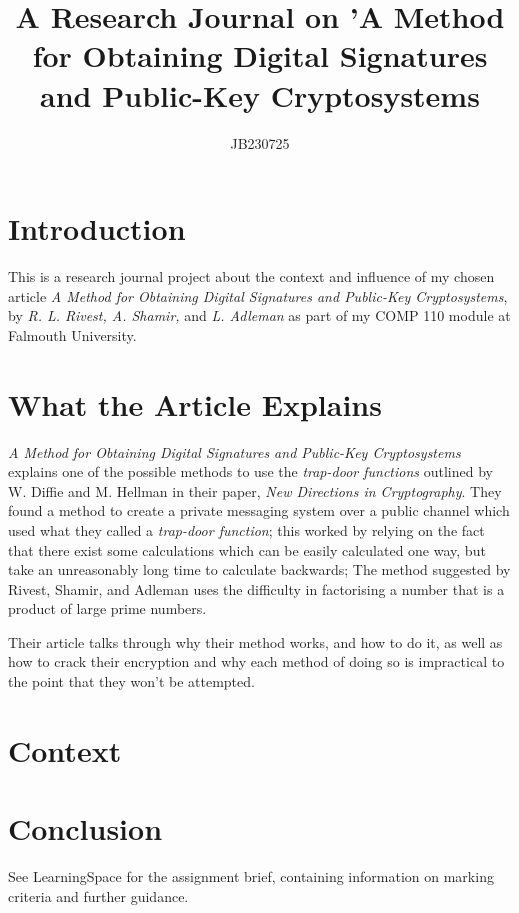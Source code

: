 \documentclass{article}
\title{A Research Journal on 'A Method for Obtaining Digital Signatures and Public-Key Cryptosystems}
\author{JB230725}
\begin{document}
\maketitle

\section{Introduction}

This is a research journal project about the context and influence of my chosen article \textit{A Method for Obtaining Digital Signatures and Public-Key Cryptosystems}, by \textit{R. L. Rivest, A. Shamir,} and \textit{L. Adleman} \cite{rivest1978_rsa} as part of my COMP 110 module at Falmouth University.

\section{What the Article Explains}

\textit{A Method for Obtaining Digital Signatures and Public-Key Cryptosystems} explains one of the possible methods to use the \textit{trap-door functions} outlined by W. Diffie and M. Hellman in their paper, \textit{New Directions in Cryptography}\cite{diffie1976new}. They found a method to create a private messaging system over a public channel which used what they called a \textit{trap-door function}; this worked by relying on the fact that there exist some calculations which can be easily calculated one way, but take an unreasonably long time to calculate backwards; The method suggested by Rivest, Shamir, and Adleman uses the difficulty in factorising a number that is a product of large prime numbers. 

Their article talks through why their method works, and how to do it, as well as how to crack their encryption and why each method of doing so is impractical to the point that they won't be attempted.

\section{Context}


\section{Conclusion}

See LearningSpace for the assignment brief, containing information on marking criteria and further guidance.



\end{document}
